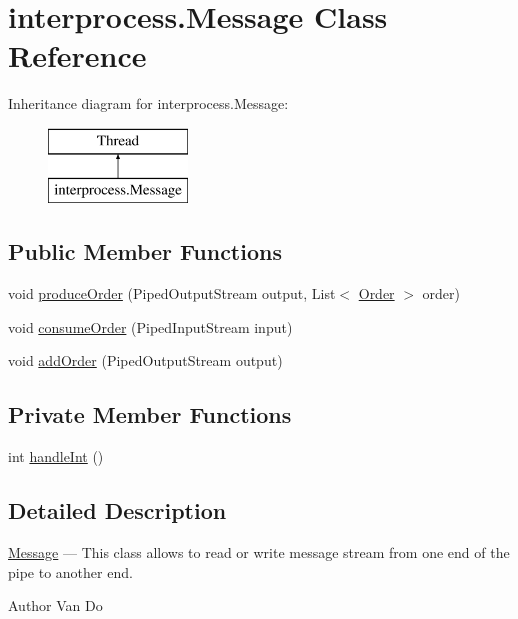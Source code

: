\hypertarget{classinterprocess_1_1_message}{}\section{interprocess.\+Message Class Reference}
\label{classinterprocess_1_1_message}
Inheritance diagram for interprocess.\+Message\+:\begin{figure}[H]
\begin{center}
\leavevmode
\includegraphics[height=2.000000cm]{classinterprocess_1_1_message}
\end{center}
\end{figure}
\subsection*{Public Member Functions}
\begin{DoxyCompactItemize}
\item 
void \hyperlink{classinterprocess_1_1_message_a753fc2d9bffff59d32d9a20512ac6639}{produce\+Order} (Piped\+Output\+Stream output, List$<$ \hyperlink{classinterprocess_1_1_order}{Order} $>$ order)
\item 
void \hyperlink{classinterprocess_1_1_message_ada4c768cf0688deaede00d43220fd100}{consume\+Order} (Piped\+Input\+Stream input)
\item 
void \hyperlink{classinterprocess_1_1_message_a66e94ca490a4bae0e26db95052aa3956}{add\+Order} (Piped\+Output\+Stream output)
\end{DoxyCompactItemize}
\subsection*{Private Member Functions}
\begin{DoxyCompactItemize}
\item 
int \hyperlink{classinterprocess_1_1_message_a594aec63ced8dc0b7440ceae46e71c52}{handle\+Int} ()
\end{DoxyCompactItemize}


\subsection{Detailed Description}
\hyperlink{classinterprocess_1_1_message}{Message} --- This class allows to read or write message stream from one end of the pipe to another end. \begin{DoxyAuthor}{Author}
Van Do 
\end{DoxyAuthor}



